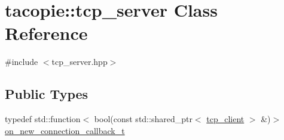 \hypertarget{classtacopie_1_1tcp__server}{}\section{tacopie\+:\+:tcp\+\_\+server Class Reference}
\label{classtacopie_1_1tcp__server}


{\ttfamily \#include $<$tcp\+\_\+server.\+hpp$>$}

\subsection*{Public Types}
\begin{DoxyCompactItemize}
\item 
typedef std\+::function$<$ bool(const std\+::shared\+\_\+ptr$<$ \hyperlink{classtacopie_1_1tcp__client}{tcp\+\_\+client} $>$ \&)$>$ \hyperlink{classtacopie_1_1tcp__server_a103cb4e6fcab00f88a708aabd38b66ff}{on\+\_\+new\+\_\+connection\+\_\+callback\+\_\+t}
\end{DoxyCompactItemize}
